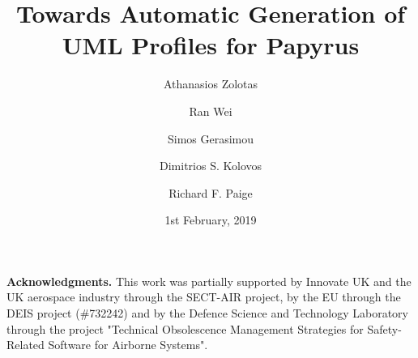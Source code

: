 \documentclass[global]{svjour}
\begin{document}
\title{Towards Automatic Generation of \\ UML Profiles for Papyrus}

\author{Athanasios Zolotas \and Ran Wei \and Simos Gerasimou \and Dimitrios S. Kolovos \and Richard F. Paige
	}

\date{1st February, 2019}
\maketitle{}










\noindent\textbf{Acknowledgments.}
This work was partially supported by Innovate UK and the UK aerospace industry 
through the SECT-AIR project, by the EU through the DEIS project (\#732242) and 
by the Defence Science and Technology Laboratory through the project "Technical 
Obsolescence Management Strategies for Safety-Related Software for Airborne 
Systems".

\clearpage


\end{document}
